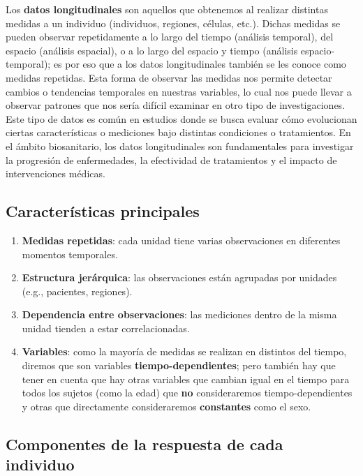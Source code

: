 \documentclass[
  letterpaper,
  DIV=11,
  numbers=noendperiod]{scrreprt}
\providecommand{\tightlist}{%
  \setlength{\itemsep}{0pt}\setlength{\parskip}{0pt}}\usepackage{longtable,booktabs,array}
\begin{document}
Los \textbf{datos longitudinales} son aquellos que obtenemos al realizar
distintas medidas a un individuo (individuos, regiones, células, etc.).
Dichas medidas se pueden observar repetidamente a lo largo del tiempo
(análisis temporal), del espacio (análisis espacial), o a lo largo del
espacio y tiempo (análisis espacio-temporal); es por eso que a los datos
longitudinales también se les conoce como medidas repetidas. Esta forma
de observar las medidas nos permite detectar cambios o tendencias
temporales en nuestras variables, lo cual nos puede llevar a observar
patrones que nos sería difícil examinar en otro tipo de investigaciones.
Este tipo de datos es común en estudios donde se busca evaluar cómo
evolucionan ciertas características o mediciones bajo distintas
condiciones o tratamientos. En el ámbito biosanitario, los datos
longitudinales son fundamentales para investigar la progresión de
enfermedades, la efectividad de tratamientos y el impacto de
intervenciones médicas.

\subsection{Características
principales}\label{caracteruxedsticas-principales}

\begin{enumerate}
\def\labelenumi{\arabic{enumi}.}
\tightlist
\item
  \textbf{Medidas repetidas}: cada unidad tiene varias observaciones en
  diferentes momentos temporales.
\item
  \textbf{Estructura jerárquica}: las observaciones están agrupadas por
  unidades (e.g., pacientes, regiones).
\item
  \textbf{Dependencia entre observaciones}: las mediciones dentro de la
  misma unidad tienden a estar correlacionadas.
\item
  \textbf{Variables}: como la mayoría de medidas se realizan en
  distintos del tiempo, diremos que son variables
  \textbf{tiempo-dependientes}; pero también hay que tener en cuenta que
  hay otras variables que cambian igual en el tiempo para todos los
  sujetos (como la edad) que \textbf{no} consideraremos
  tiempo-dependientes y otras que directamente consideraremos
  \textbf{constantes} como el sexo.
\end{enumerate}

\subsection{Componentes de la respuesta de cada
individuo}\label{componentes-de-la-respuesta-de-cada-individuo}
\end{document}
